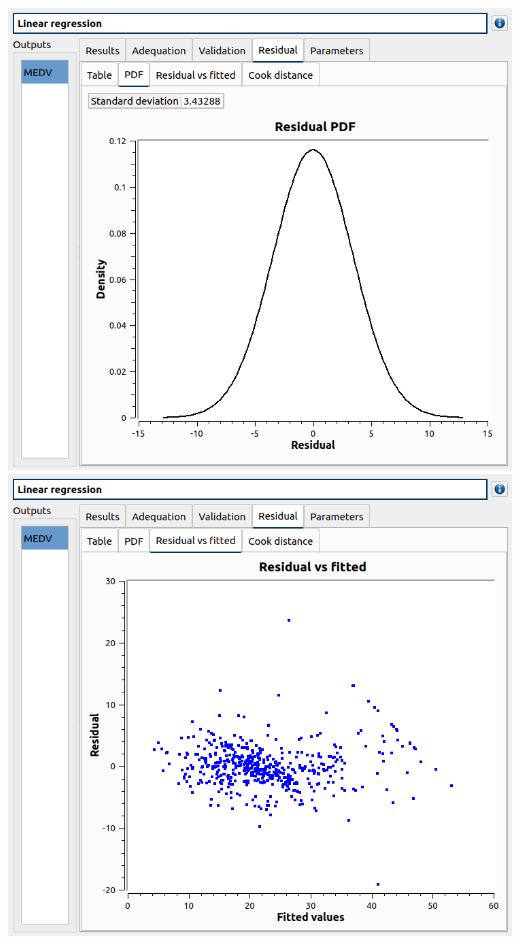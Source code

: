 \documentclass[aspectratio=169]{beamer}
\begin{document}
\begin{frame}
\begin{columns}

    \begin{center}
      \includegraphics[width=\textwidth]{figures/linearModel7.png}
      \includegraphics[width=\textwidth]{figures/linearModel8.png}
    \end{center}

  \end{columns}
\end{frame}
\end{document}
